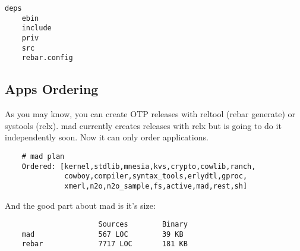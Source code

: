 \begin{lstlisting}[caption=OTP Application]
    deps
    ebin
    include
    priv
    src
    rebar.config
\end{lstlisting}

\subsection{Apps Ordering}

As you may know, you can create OTP releases with
reltool (rebar generate) or systools (relx). mad currently
creates releases with relx but is going to do it independently soon.
Now it can only order applications.

\begin{lstlisting}
    # mad plan
    Ordered: [kernel,stdlib,mnesia,kvs,crypto,cowlib,ranch,
              cowboy,compiler,syntax_tools,erlydtl,gproc,
              xmerl,n2o,n2o_sample,fs,active,mad,rest,sh]
\end{lstlisting}

And the good part about mad is it's size:

\begin{lstlisting}
                      Sources        Binary
    mad               567 LOC        39 KB
    rebar             7717 LOC       181 KB
\end{lstlisting}
